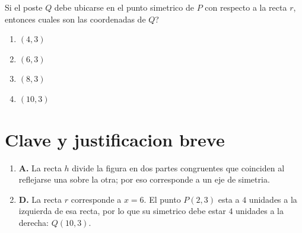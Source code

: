 \documentclass[12pt]{article}
\begin{document}
\begin{enumerate}[label=\textbf{\arabic*.}, itemsep=1.05cm]
Si el poste $Q$ debe ubicarse en el punto simetrico de $P$ con respecto a la recta $r$, entonces \textquestiondown cuales son las coordenadas de $Q$?

\begin{enumerate}[label=\Alph*)]
  \item $(4,3)$
  \item $(6,3)$
  \item $(8,3)$
  \item $(10,3)$
\end{enumerate}

\end{enumerate}

\section*{Clave y justificacion breve}

\begin{enumerate}[label=\textbf{\arabic*.}]
  \item \textbf{A.} La recta $h$ divide la figura en dos partes congruentes que coinciden al reflejarse una sobre la otra; por eso corresponde a un eje de simetria.
  \item \textbf{D.} La recta $r$ corresponde a $x=6$. El punto $P(2,3)$ esta a $4$ unidades a la izquierda de esa recta, por lo que su simetrico debe estar $4$ unidades a la derecha: $Q(10,3)$.
\end{enumerate}
\end{document}
